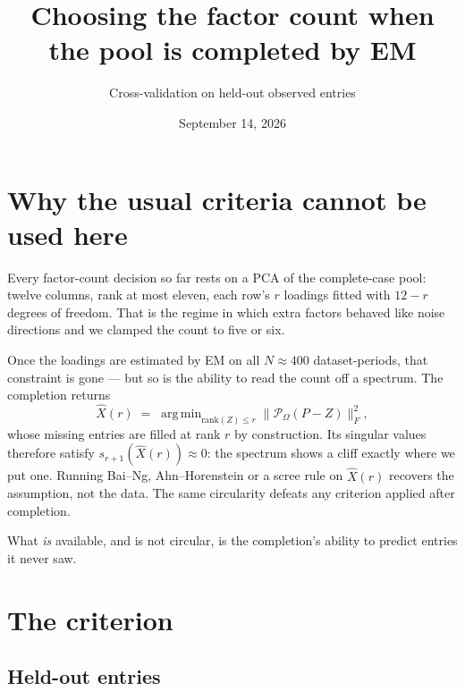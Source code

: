 \documentclass[11pt]{article}
\title{Choosing the factor count when the pool is completed by EM}
\author{Cross-validation on held-out observed entries}
\date{September 14, 2026}
\DeclareMathOperator*{\argmin}{arg\,min}
\begin{document}
\maketitle

\section{Why the usual criteria cannot be used here}

Every factor-count decision so far rests on a PCA of the complete-case pool:
twelve columns, rank at most eleven, each row's $r$ loadings fitted with
$12-r$ degrees of freedom. That is the regime in which extra factors behaved
like noise directions and we clamped the count to five or six.

Once the loadings are estimated by EM on all $N \approx 400$ dataset-periods,
that constraint is gone --- but so is the ability to read the count off a
spectrum. The completion returns
\begin{equation}
  \hat X(r) \;=\; \argmin_{\mathrm{rank}(Z)\le r}
  \bigl\| \mathcal{P}_\Omega(P - Z) \bigr\|_F^2 ,
\end{equation}
whose missing entries are filled at rank $r$ by construction. Its singular
values therefore satisfy $s_{r+1}(\hat X(r)) \approx 0$: the spectrum shows a
cliff exactly where we put one. Running Bai--Ng, Ahn--Horenstein or a scree rule
on $\hat X(r)$ recovers the assumption, not the data. The same circularity
defeats any criterion applied after completion.

What \emph{is} available, and is not circular, is the completion's ability to
predict entries it never saw.

\section{The criterion}

\subsection{Held-out entries}
\end{document}

